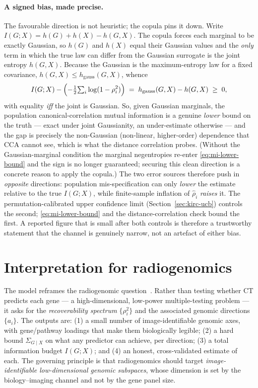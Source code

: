 \documentclass{article}
\newcommand{\Sgcx}{\Sigma_{G\mid X}}
\begin{document}
\paragraph{A signed bias, made precise.}
The favourable direction is not heuristic; the copula pins it down. Write
$I(G;X) = h(G) + h(X) - h(G,X)$. The copula forces each marginal to be exactly
Gaussian, so $h(G)$ and $h(X)$ equal their Gaussian values and the \emph{only}
term in which the true law can differ from the Gaussian surrogate is the joint
entropy $h(G,X)$. Because the Gaussian is the maximum-entropy law for a fixed
covariance, $h(G,X) \le h_{\mathrm{gauss}}(G,X)$, whence
\begin{equation}
I(G;X) - \Bigl(-\tfrac12{\textstyle\sum_i}\log(1-\rho_i^2)\Bigr)
\;=\; h_{\mathrm{gauss}}(G,X) - h(G,X) \;\ge\; 0,
\label{eq:mi-lower-bound}
\end{equation}
with equality \emph{iff} the joint is Gaussian. So, given Gaussian marginals,
the population canonical-correlation mutual information is a genuine \emph{lower}
bound on the truth --- exact under joint Gaussianity, an under-estimate
otherwise --- and the gap is precisely the non-Gaussian (non-linear,
higher-order) dependence that CCA cannot see, which is what the distance
correlation probes. (Without the Gaussian-marginal condition the marginal
negentropies re-enter \eqref{eq:mi-lower-bound} and the sign is no longer
guaranteed; securing this clean direction is a concrete reason to apply the
copula.) The two error sources therefore push in \emph{opposite} directions:
population mis-specification can only \emph{lower} the estimate relative to the
true $I(G;X)$, while finite-sample inflation of $\hat\rho_i$ \emph{raises} it.
The permutation-calibrated upper confidence limit
(Section~\ref{sec:kirc-ucb}) controls the second; \eqref{eq:mi-lower-bound} and
the distance-correlation check bound the first. A reported figure that is small
after both controls is therefore a trustworthy statement that the channel is
genuinely narrow, not an artefact of either bias.

\section{Interpretation for radiogenomics}
\label{sec:interpretation}

The model reframes the radiogenomic
question~\citep{rutman2009radiogenomics,gillies2016radiomics,lambin2017radiomics,bodalal2019radiogenomics}.
Rather than testing whether CT
predicts each gene --- a high-dimensional, low-power multiple-testing problem ---
it asks for the \emph{recoverability spectrum} $\{\rho_i^2\}$ and the associated
genomic directions $\{a_i\}$. The outputs are: (1) a small number of
image-identifiable genomic axes, with gene/pathway loadings that make them
biologically legible; (2) a hard bound $\Sgcx$ on what any predictor can achieve,
per direction; (3) a total information budget $I(G;X)$; and (4) an honest,
cross-validated estimate of each. The governing principle is that radiogenomics
should target \emph{image-identifiable low-dimensional genomic subspaces}, whose
dimension is set by the biology--imaging channel and not by the gene panel size.
\end{document}
